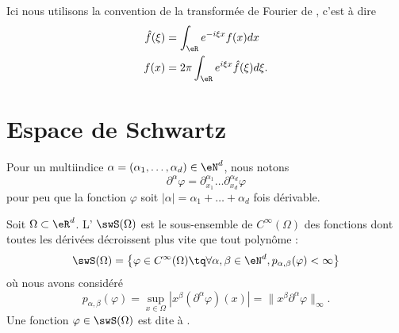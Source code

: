 
Ici nous utilisons la convention de la transformée de Fourier de , c'est à dire
\begin{subequations}
    \begin{align}
        \hat f(\xi)&=\int_{\eR} e^{-i\xi x}f(x)dx\\
        f(x)&=2\pi\int_{\eR} e^{i\xi x}\hat f(\xi)d\xi.
    \end{align}
\end{subequations}

\section{Espace de Schwartz}

Pour un multiindice \( \alpha=(\alpha_1,\ldots, \alpha_d)\in \eN^d\), nous notons
\begin{equation}
    \partial^{\alpha}\varphi=\partial_{x_1}^{\alpha_1}\ldots\partial_{x_d}^{\alpha_d}\varphi
\end{equation}
pour peu que la fonction \( \varphi\) soit \( | \alpha |=\alpha_1+\ldots +\alpha_d\) fois dérivable.

\begin{definition}  \label{DefHHyQooK}
    Soit \( \Omega\subset\eR^d\). L' \( \swS(\Omega)\) est le sous-ensemble de \(  C^{\infty}(\Omega)\) des fonctions dont toutes les dérivées décroissent plus vite que tout polynôme :
    \begin{equation}
        \swS(\Omega)=\big\{   \varphi\in C^{\infty}(\Omega)\tq\forall \alpha,\beta\in \eN^d, p_{\alpha,\beta}(\varphi)<\infty   \big\}
    \end{equation}
    où nous avons considéré
    \begin{equation}    \label{EqOWdChCu}
        p_{\alpha,\beta}(\varphi)=\sup_{x\in \Omega}| x^{\beta}(\partial^{\alpha}\varphi)(x) |=\| x^{\beta}\partial^{\alpha}\varphi \|_{\infty}.
    \end{equation}
    Une fonction \( \varphi\in\swS(\Omega)\) est dite à .
\end{definition}

